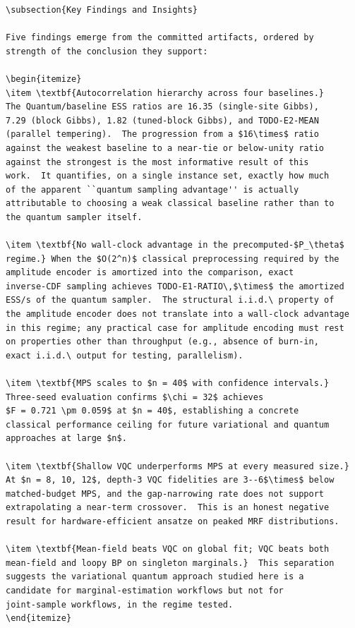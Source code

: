 \begin{verbatim}
\subsection{Key Findings and Insights}

Five findings emerge from the committed artifacts, ordered by
strength of the conclusion they support:

\begin{itemize}
\item \textbf{Autocorrelation hierarchy across four baselines.}
The Quantum/baseline ESS ratios are 16.35 (single-site Gibbs),
7.29 (block Gibbs), 1.82 (tuned-block Gibbs), and TODO-E2-MEAN
(parallel tempering).  The progression from a $16\times$ ratio
against the weakest baseline to a near-tie or below-unity ratio
against the strongest is the most informative result of this
work.  It quantifies, on a single instance set, exactly how much
of the apparent ``quantum sampling advantage'' is actually
attributable to choosing a weak classical baseline rather than to
the quantum sampler itself.

\item \textbf{No wall-clock advantage in the precomputed-$P_\theta$
regime.} When the $O(2^n)$ classical preprocessing required by the
amplitude encoder is amortized into the comparison, exact
inverse-CDF sampling achieves TODO-E1-RATIO\,$\times$ the amortized
ESS/s of the quantum sampler.  The structural i.i.d.\ property of
the amplitude encoder does not translate into a wall-clock advantage
in this regime; any practical case for amplitude encoding must rest
on properties other than throughput (e.g., absence of burn-in,
exact i.i.d.\ output for testing, parallelism).

\item \textbf{MPS scales to $n = 40$ with confidence intervals.}
Three-seed evaluation confirms $\chi = 32$ achieves
$F = 0.721 \pm 0.059$ at $n = 40$, establishing a concrete
classical performance ceiling for future variational and quantum
approaches at large $n$.

\item \textbf{Shallow VQC underperforms MPS at every measured size.}
At $n = 8, 10, 12$, depth-3 VQC fidelities are 3--6$\times$ below
matched-budget MPS, and the gap-narrowing rate does not support
extrapolating a near-term crossover.  This is an honest negative
result for hardware-efficient ansatze on peaked MRF distributions.

\item \textbf{Mean-field beats VQC on global fit; VQC beats both
mean-field and loopy BP on singleton marginals.}  This separation
suggests the variational quantum approach studied here is a
candidate for marginal-estimation workflows but not for
joint-sample workflows, in the regime tested.
\end{itemize}
\end{verbatim}

